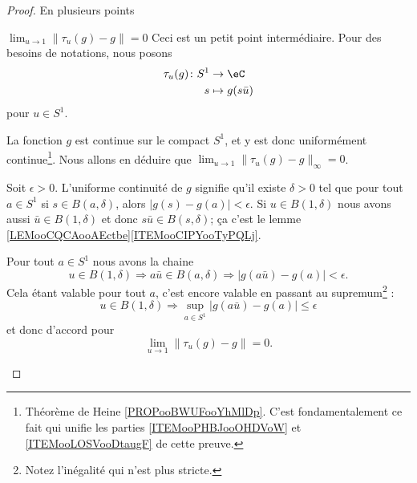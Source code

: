 \begin{proof}
    
    En plusieurs points
    \begin{subproof}

        \item[\( \lim_{u\to 1} \| \tau_u(g)-g \|=0\)]
            Ceci est un petit point intermédiaire. Pour des besoins de notations, nous posons
            \begin{equation}
                \begin{aligned}
                    \tau_u(g)\colon S^1&\to \eC \\
                    s&\mapsto g(s\bar u)
                \end{aligned}
            \end{equation}
            pour \( u\in S^1\). 

            La fonction \( g\) est continue sur le compact \( S^1\), et y est donc uniformément continue\footnote{Théorème de Heine \ref{PROPooBWUFooYhMlDp}. C'est fondamentalement ce fait qui unifie les parties \ref{ITEMooPHBJooOHDVoW} et \ref{ITEMooLOSVooDtaugF} de cette preuve.}. Nous allons en déduire que \( \lim_{u\to 1} \| \tau_u(g)-g \|_{\infty}=0\).

            Soit \( \epsilon>0\). L'uniforme continuité de \( g\) signifie qu'il existe \( \delta>0\) tel que pour tout \( a\in S^1\) si \( s\in B(a,\delta)\), alors \( \big| g(s)-g(a) \big|<\epsilon\). Si \( u\in B(1,\delta)\) nous avons aussi \( \bar u\in B(1,\delta)\) et donc \( s\bar u\in B(s,\delta)\); ça c'est le lemme \ref{LEMooCQCAooAEctbe}\ref{ITEMooCIPYooTyPQLj}.

            Pour tout \( a\in S^1\) nous avons la chaine
            \begin{equation}
                u\in B(1,\delta)\Rightarrow a\bar u\in B(a,\delta)\Rightarrow \big| g(a\bar u)-g(a) \big|<\epsilon.
            \end{equation}
            Cela étant valable pour tout \( a\), c'est encore valable en passant au supremum\footnote{Notez l'inégalité qui n'est plus stricte.} :
            \begin{equation}
                u\in B(1,\delta)\Rightarrow\sup_{a\in S^1}\big| g(a\bar u)-g(a) \big|\leq\epsilon
            \end{equation}
            et donc d'accord pour
            \begin{equation}
                \lim_{u\to 1} \| \tau_u(g)-g \|=0.
            \end{equation}


\end{subproof}
\end{proof}
